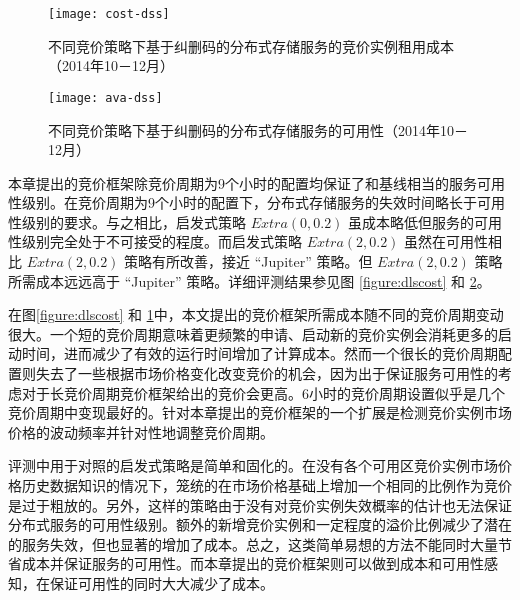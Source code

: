 \begin{figure}
  \centering
  \texttt{[image: cost-dss]}
  \caption{不同竞价策略下基于纠删码的分布式存储服务的竞价实例租用成本（2014年10－12月）}
  \label{figure:dsscost}
\end{figure}
\begin{figure}
  \centering
  \texttt{[image: ava-dss]}
  \caption{不同竞价策略下基于纠删码的分布式存储服务的可用性（2014年10－12月）}
  \label{figure:dssavailability}
\end{figure}

本章提出的竞价框架除竞价周期为9个小时的配置均保证了和基线相当的服务可用性级别。在竞价周期为9个小时的配置下，分布式存储服务的失效时间略长于可用性级别的要求。与之相比，启发式策略 $Extra(0, 0.2)$ 虽成本略低但服务的可用性级别完全处于不可接受的程度。而启发式策略 $Extra(2, 0.2)$ 虽然在可用性相比 $Extra(2, 0.2)$ 策略有所改善，接近 ``Jupiter'' 策略。但 $Extra(2, 0.2)$ 策略所需成本远远高于 ``Jupiter'' 策略。详细评测结果参见图 \ref{figure:dlscost} 和 \ref{figure:dssavailability}。

在图\ref{figure:dlscost} 和 \ref{figure:dsscost}中，本文提出的竞价框架所需成本随不同的竞价周期变动很大。一个短的竞价周期意味着更频繁的申请、启动新的竞价实例会消耗更多的启动时间，进而减少了有效的运行时间增加了计算成本。然而一个很长的竞价周期配置则失去了一些根据市场价格变化改变竞价的机会，因为出于保证服务可用性的考虑对于长竞价周期竞价框架给出的竞价会更高。6小时的竞价周期设置似乎是几个竞价周期中变现最好的。针对本章提出的竞价框架的一个扩展是检测竞价实例市场价格的波动频率并针对性地调整竞价周期。

评测中用于对照的启发式策略是简单和固化的。在没有各个可用区竞价实例市场价格历史数据知识的情况下，笼统的在市场价格基础上增加一个相同的比例作为竞价是过于粗放的。另外，这样的策略由于没有对竞价实例失效概率的估计也无法保证分布式服务的可用性级别。额外的新增竞价实例和一定程度的溢价比例减少了潜在的服务失效，但也显著的增加了成本。总之，这类简单易想的方法不能同时大量节省成本并保证服务的可用性。而本章提出的竞价框架则可以做到成本和可用性感知，在保证可用性的同时大大减少了成本。

